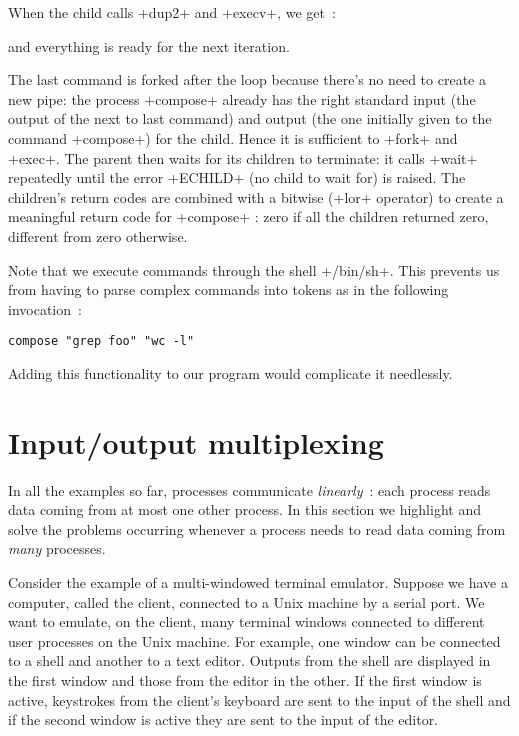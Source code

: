 %
When the child calls \ml+dup2+ and \ml+execv+, we get~:
\begin{myimage}[width="100\%"]
\end{myimage}
%
and everything is ready for the next iteration. 

The last command is forked after the loop because there's no need to
create a new pipe: the process \ml+compose+ already has the right
standard input (the output of the next to last command) and output
(the one initially given to the command \ml+compose+) for the
child. Hence it is sufficient to \ml+fork+ and \ml+exec+. The parent then
waits for its children to terminate: it calls \ml+wait+ repeatedly
until the error \ml+ECHILD+ (no child to wait for) is raised. The
children's return codes are combined with a bitwise 
(\ml+lor+ operator) to create a meaningful return code for
\ml+compose+ : zero if all the children returned zero, different from
zero otherwise.

Note that we execute commands through the shell \ml+/bin/sh+. This
prevents us from having to parse complex commands into tokens as
in the following invocation~:
%
\begin{lstlisting}
compose "grep foo" "wc -l"
\end{lstlisting}
%
Adding this functionality to our program would complicate it needlessly.

\section{Input/output multiplexing}

In all the examples so far, processes communicate \emph{linearly}~:
each process reads data coming from at most one other process. In this
section we highlight and solve the problems occurring whenever a
process needs to read data coming from \emph{many} processes.

Consider the example of a multi-windowed terminal emulator. Suppose we
have a computer, called the client, connected to a Unix machine by a
serial port. We want to emulate, on the client, many terminal windows
connected to different user processes on the Unix machine. For example,
one window can be connected to a shell and another to a text
editor. Outputs from the shell are displayed in the first window and
those from the editor in the other. If the first window is
active, keystrokes from the client's keyboard are sent to the input of
the shell and if the second window is active they are sent to the
input of the editor.


